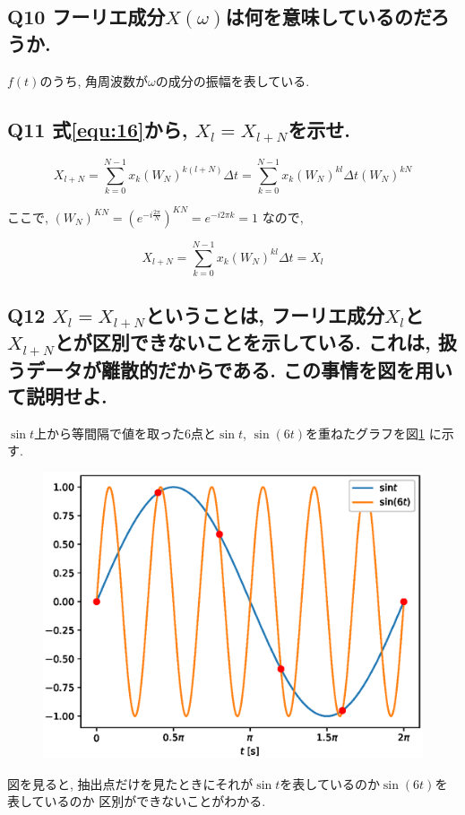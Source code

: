 \documentclass[titlepage]{jarticle}
\begin{document}
\subsection{Q10 フーリエ成分$X(\omega)$は何を意味しているのだろうか.}
$f(t)$のうち, 角周波数が$\omega$の成分の振幅を表している.

\subsection{Q11 式\ref{equ:16}から, $X_l=X_{l+N}$を示せ.}
\begin{equation*}
  X_{l+N}=\sum_{k=0}^{N-1}x_k(W_N)^{k(l+N)}\Delta t
  =\sum_{k=0}^{N-1}x_k(W_N)^{kl}\Delta t(W_N)^{kN}
\end{equation*}

ここで,
$(W_N)^{KN}=\left(e^{-i\frac{2\pi}{N}}\right)^{KN}=e^{-i2\pi k}=1$
なので,

\begin{equation*}
  X_{l+N}=\sum_{k=0}^{N-1}x_k(W_N)^{kl}\Delta t=X_l
\end{equation*}

\subsection{Q12 $X_l=X_{l+N}$ということは,
フーリエ成分$X_l$と$X_{l+N}$とが区別できないことを示している.
これは, 扱うデータが離散的だからである. この事情を図を用いて説明せよ.}

$\sin t$上から等間隔で値を取った6点と$\sin t$, $\sin(6t)$を重ねたグラフを図\ref{fig:12}
に示す.

\begin{figure}[H]
  \centering
  \includegraphics[width=0.6\hsize]{img/12.eps}
  \caption{}
  \label{fig:12}
\end{figure}

図を見ると,
抽出点だけを見たときにそれが$\sin t$を表しているのか$\sin(6t)$を表しているのか
区別ができないことがわかる.
\end{document}
